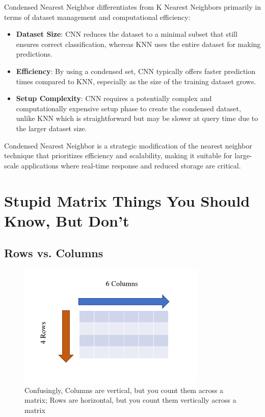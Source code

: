 \documentclass[12pt]{article}
\begin{document}
Condensed Nearest Neighbor differentiates from K Nearest Neighbors primarily in terms of dataset management and computational efficiency:

\begin{itemize}
    \item \textbf{Dataset Size}: CNN reduces the dataset to a minimal subset that still ensures correct classification, whereas KNN uses the entire dataset for making predictions.
    \item \textbf{Efficiency}: By using a condensed set, CNN typically offers faster prediction times compared to KNN, especially as the size of the training dataset grows.
    \item \textbf{Setup Complexity}: CNN requires a potentially complex and computationally expensive setup phase to create the condensed dataset, unlike KNN which is straightforward but may be slower at query time due to the larger dataset size.
\end{itemize}

Condensed Nearest Neighbor is a strategic modification of the nearest neighbor technique that prioritizes efficiency and scalability, making it suitable for large-scale applications where real-time response and reduced storage are critical.


\section {Stupid Matrix Things You Should Know, But Don't}
\subsection{Rows vs. Columns}
\begin{figure}[H]
    \centering
    \includegraphics[width=0.8\textwidth]{./RowsAndColumns.png} %
	\caption{Confusingly, Columns are vertical, but you count them across a matrix; Rows are horizontal, but you count them vertically across a matrix}
\end{figure}
\end{document}
